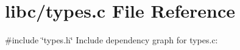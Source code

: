 \hypertarget{a00131}{}\section{libc/types.c File Reference}
\label{a00131}
{\ttfamily \#include \char`\"{}types.\+h\char`\"{}}\newline
Include dependency graph for types.\+c\+:
